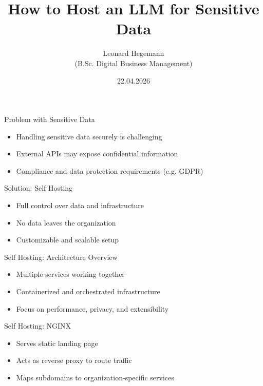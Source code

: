 \documentclass{beamer}
\title{How to Host an LLM for Sensitive Data}
\author{Leonard Hegemann \\ (B.Sc. Digital Business Management)}
\institute{Universität Hohenheim}
\date{22.04.2026}
\begin{document}
\frame{\titlepage}


\begin{frame}{Problem with Sensitive Data}
\begin{itemize}
    \item Handling sensitive data securely is challenging
    \item External APIs may expose confidential information
    \item Compliance and data protection requirements (e.g. GDPR)
\end{itemize}
\end{frame}


\begin{frame}{Solution: Self Hosting}
\begin{itemize}
    \item Full control over data and infrastructure
    \item No data leaves the organization
    \item Customizable and scalable setup
\end{itemize}
\end{frame}


\begin{frame}{Self Hosting: Architecture Overview}
\begin{itemize}
    \item Multiple services working together
    \item Containerized and orchestrated infrastructure
    \item Focus on performance, privacy, and extensibility
\end{itemize}
\end{frame}


\begin{frame}{Self Hosting: NGINX}
\begin{itemize}
    \item Serves static landing page
    \item Acts as reverse proxy to route traffic
    \item Maps subdomains to organization-specific services
\end{itemize}
\end{frame}
\end{document}
